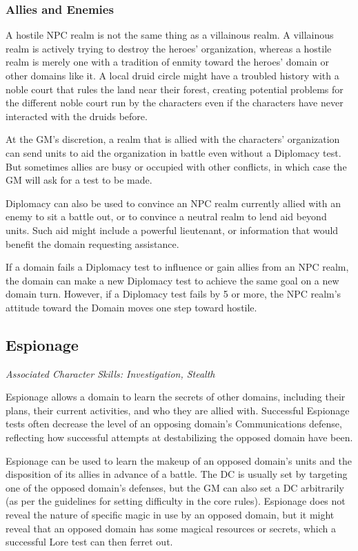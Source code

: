 \documentclass[10pt,a4paper,twoside,bg=print,twocolumn,openany,nodeprecatedcode]{dndbook}
\begin{document}
\subsubsection{Allies and Enemies}
A hostile NPC realm is not the same thing as a villainous realm. A villainous realm is actively trying to destroy the heroes' organization, whereas a hostile realm is merely one with a tradition of enmity toward the heroes' domain or other domains like it. A local druid circle might have a troubled history with a noble court that rules the land near their forest, creating potential problems for the different noble court run by the characters even if the characters have never interacted with the druids before.

At the GM's discretion, a realm that is allied with the characters' organization can send units to aid the organization in battle even without a Diplomacy test. But sometimes allies are busy or occupied with other conflicts, in which case the GM will ask for a test to be made.

Diplomacy can also be used to convince an NPC realm currently allied with an enemy to sit a battle out, or to convince a neutral realm to lend aid beyond units. Such aid might include a powerful lieutenant, or information that would benefit the domain requesting assistance.

If a domain fails a Diplomacy test to influence or gain allies from an NPC realm, the domain can make a new Diplomacy test to achieve the same goal on a new domain turn. However, if a Diplomacy test fails by 5 or more, the NPC realm's attitude toward the Domain moves one step toward hostile.

\subsection{Espionage}
\textit{Associated Character Skills: Investigation, Stealth}

Espionage allows a domain to learn the secrets of other domains, including their plans, their current activities, and who they are allied with. Successful Espionage tests often decrease the level of an opposing domain's Communications defense, reflecting how successful attempts at destabilizing the opposed domain have been.

Espionage can be used to learn the makeup of an opposed domain's units and the disposition of its allies in advance of a battle. The DC is usually set by targeting one of the opposed domain's defenses, but the GM can also set a DC arbitrarily (as per the guidelines for setting difficulty in the core rules). Espionage does not reveal the nature of specific magic in use by an opposed domain, but it might reveal that an opposed domain has some magical resources or secrets, which a successful Lore test can then ferret out.
\end{document}
